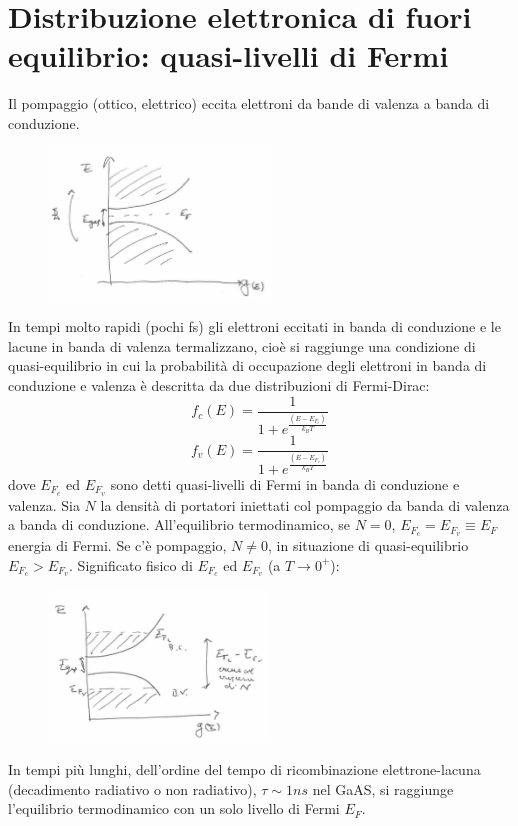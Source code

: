 \section{Distribuzione elettronica di fuori equilibrio: quasi-livelli di Fermi}
Il pompaggio (ottico, elettrico) eccita elettroni da bande di valenza a banda di conduzione.
\begin{figure}[H]
\centering
\includegraphics[height=4cm]{images/laser_80_2}
\end{figure}
\noindent
In tempi molto rapidi (pochi fs) gli elettroni eccitati in banda di conduzione e le lacune in banda di valenza termalizzano, cioè si raggiunge una condizione di quasi-equilibrio in cui la probabilità di occupazione degli elettroni in banda di conduzione e valenza è descritta da due distribuzioni di Fermi-Dirac:
\begin{equation*}
f_c(E) = \frac{1}{1+e^\frac{(E - E_{F_c})}{k_B T}}
\end{equation*}
\begin{equation*}
f_v(E) = \frac{1}{1+e^\frac{(E - E_{F_v})}{k_B T}}
\end{equation*}
dove $E_{F_c}$ ed $E_{F_v}$ sono detti quasi-livelli di Fermi in banda di conduzione e valenza. Sia $N$ la densità di portatori iniettati col pompaggio da banda di valenza a banda di conduzione. All'equilibrio termodinamico, se $N=0$, $E_{F_c} = E_{F_v} \equiv E_F$ energia di Fermi.
Se c'è pompaggio, $N\neq 0$, in situazione di quasi-equilibrio $E_{F_c} > E_{F_v}$. Significato fisico di $E_{F_c}$ ed $E_{F_v}$ (a $T\rightarrow0^+$):
\begin{figure}[H]
\centering
\includegraphics[height=4cm]{images/laser_80_3}
\end{figure}
\noindent
In tempi più lunghi, dell'ordine del tempo di ricombinazione elettrone-lacuna (decadimento radiativo o non radiativo), $\tau \sim 1ns$ nel GaAS, si raggiunge l'equilibrio termodinamico con un solo livello di Fermi $E_F$.

